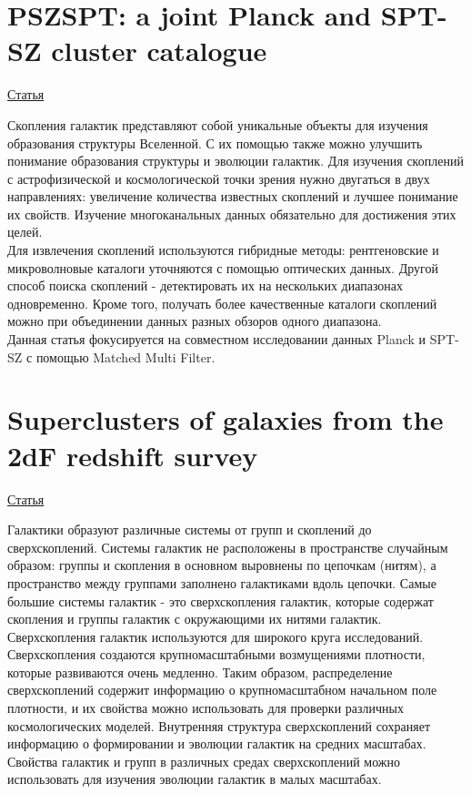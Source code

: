 \documentclass{article}
\begin{document}
\section{PSZSPT: a joint Planck and SPT-SZ cluster catalogue}
\hyperlink{https://arxiv.org/pdf/2009.08822.pdf}{Статья}

Скопления галактик представляют собой уникальные объекты для изучения образования структуры 
Вселенной. С их помощью также можно улучшить понимание образования структуры и эволюции галактик. 
Для изучения скоплений с астрофизической и космологической точки зрения нужно двугаться в двух 
направлениях: увеличение количества известных скоплений и лучшее понимание их свойств. Изучение 
многоканальных данных обязательно для достижения этих целей.\\

Для извлечения скоплений используются гибридные методы: рентгеновские и микроволновые каталоги 
уточняются с помощью оптических данных. Другой способ поиска скоплений - детектировать их на 
нескольких диапазонах одновременно. Кроме того, получать более качественные каталоги скоплений 
можно при объединении данных разных обзоров одного диапазона.\\

Данная статья фокусируется на совместном исследовании данных Planck и SPT-SZ с помощью Matched 
Multi Filter.\\

\section{Superclusters of galaxies from the 2dF redshift survey}
\hyperlink{https://www.aanda.org/articles/aa/pdf/2007/05/aa5296-06.pdf}{Статья}

Галактики образуют различные системы от групп и скоплений до сверхскоплений. Системы галактик 
не расположены в пространстве случайным образом: группы и скопления в основном выровнены по 
цепочкам (нитям), а пространство между группами заполнено галактиками вдоль цепочки. Самые большие
системы галактик - это сверхскопления галактик, которые содержат скопления и группы галактик с 
окружающими их нитями галактик.\\

Сверхскопления галактик используются для широкого круга исследований. Сверхскопления создаются
крупномасштабными возмущениями плотности, которые развиваются очень медленно. Таким образом, 
распределение сверхскоплений содержит информацию о крупномасштабном начальном поле плотности, и их 
свойства можно использовать для проверки различных космологических моделей. Внутренняя структура
сверхскоплений сохраняет информацию о формировании и эволюции галактик на средних масштабах. 
Свойства галактик и групп в различных средах сверхскоплений можно использовать для изучения 
эволюции галактик в малых масштабах.\\
\end{document}
